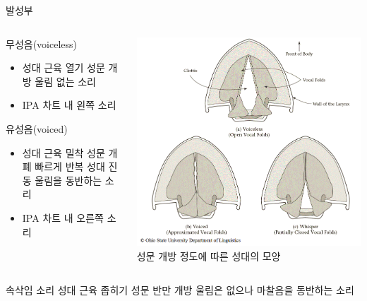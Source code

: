 \documentclass[11pt, aspectratio=169]{beamer}
\begin{document}
\begin{frame}[t]{발성부}
    \begin{columns}
        \begin{column}{0.6\textwidth}
            \begin{block}{무성음(voiceless)}
                \begin{itemize}
                    \item 성대 근육 열기 \rightarrow 성문 개방 \rightarrow 울림 없는 소리
                    \item IPA 차트 내 왼쪽 소리
                \end{itemize}
            \end{block}
            \begin{block}{유성음(voiced)}
                \begin{itemize}
                    \item 성대 근육 밀착 \rightarrow 성문 개폐 빠르게 반복 \rightarrow 성대 진동 \rightarrow 울림을 동반하는 소리
                    \item IPA 차트 내 오른쪽 소리
                \end{itemize}
            \end{block}
        \end{column}
        \begin{column}{0.33\textwidth}
            \includegraphics[width=1.0\textwidth]{img/VocalFolds.png}\\
            성문 개방 정도에 따른 성대의 모양
        \end{column}
    \end{columns}
    \begin{block}{속삭임 소리}
        성대 근육 좁히기 \rightarrow 성문 반만 개방 \rightarrow 울림은 없으나 마찰음을 동반하는 소리
    \end{block}
\end{frame}
\end{document}

